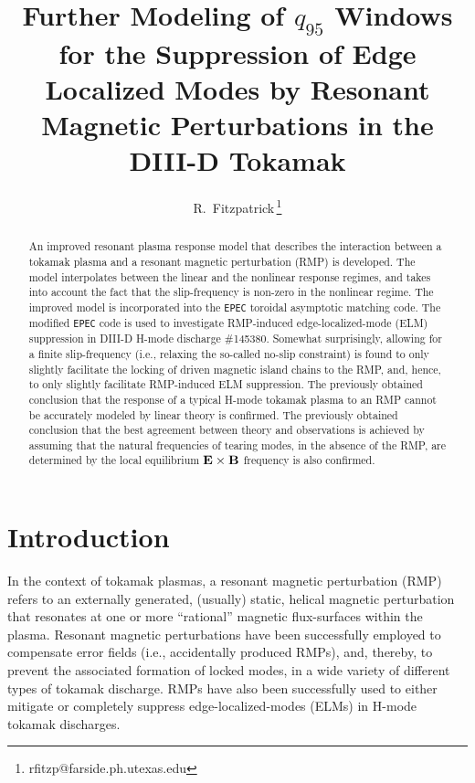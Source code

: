 \documentclass[12pt,prb,aps]{revtex4-1}
\begin{document}
\title {Further Modeling of $q_{95}$ Windows for the Suppression of Edge Localized Modes by Resonant Magnetic Perturbations in the DIII-D Tokamak}

\author{R.~Fitzpatrick\,\footnote{rfitzp@farside.ph.utexas.edu}}

\begin{abstract}
An improved resonant plasma response model that describes the interaction between a tokamak plasma and a resonant magnetic perturbation  (RMP) is developed. 
The model interpolates between the linear and the nonlinear response regimes, and takes into account the fact that the slip-frequency
is non-zero in the nonlinear regime. The improved model is incorporated into the {\tt EPEC} toroidal asymptotic matching code.
The modified {\tt EPEC} code is used to investigate RMP-induced edge-localized-mode (ELM) suppression in DIII-D H-mode discharge \#145380. 
Somewhat surprisingly, allowing for a finite slip-frequency (i.e., relaxing the so-called no-slip constraint) is found to only slightly facilitate the locking of
driven magnetic island chains to the RMP, and, hence, to only slightly facilitate RMP-induced ELM suppression.  The previously obtained conclusion 
that the response of a typical H-mode tokamak plasma to an RMP cannot be accurately modeled by linear theory is confirmed. The previously obtained conclusion that the best agreement between theory and observations is achieved by assuming that the
natural frequencies of tearing modes, in the absence of the RMP, are determined by the local equilibrium ${\bf E}\times{\bf B}$ frequency is also confirmed.
\end{abstract}

\maketitle

\section{Introduction}
In the context of tokamak plasmas, a resonant magnetic perturbation (RMP) refers to an externally
generated, (usually) static, helical magnetic perturbation that resonates at
one or more ``rational'' magnetic flux-surfaces within the plasma. Resonant magnetic perturbations have been successfully
employed to compensate error fields (i.e., accidentally produced RMPs), and, thereby,  to prevent the associated formation of
locked modes, in a wide variety of different types of tokamak discharge. \cite{error1,error2,error3} RMPs have also been  successfully used to either  
mitigate or completely suppress  edge-localized-modes (ELMs) in H-mode tokamak discharges.\cite{elm1,elm2,elm3,elm4,elm5,elm6}
\end{document}

